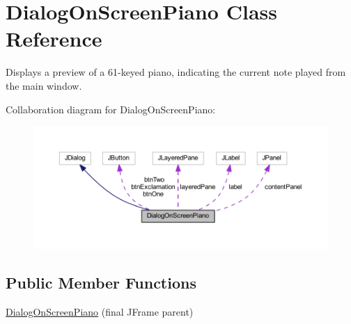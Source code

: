 \hypertarget{classcom_1_1lclion_1_1midigui_1_1_dialog_on_screen_piano}{\section{Dialog\+On\+Screen\+Piano Class Reference}
\label{classcom_1_1lclion_1_1midigui_1_1_dialog_on_screen_piano}
}


Displays a preview of a 61-\/keyed piano, indicating the current note played from the main window.  




Collaboration diagram for Dialog\+On\+Screen\+Piano\+:\nopagebreak
\begin{figure}[H]
\begin{center}
\leavevmode
\includegraphics[width=350pt]{classcom_1_1lclion_1_1midigui_1_1_dialog_on_screen_piano__coll__graph}
\end{center}
\end{figure}
\subsection*{Public Member Functions}
\begin{DoxyCompactItemize}
\item 
\hyperlink{classcom_1_1lclion_1_1midigui_1_1_dialog_on_screen_piano_a7a9746635810e3e1a2fd38e7d5bd5934}{Dialog\+On\+Screen\+Piano} (final J\+Frame parent)
\end{DoxyCompactItemize}
